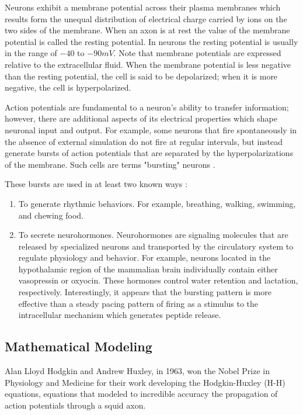 \documentclass[12]{book}
\newcommand\0{\mathbf{0}}
\newcommand\<{\langle}
\renewcommand\>{\rangle}
\begin{document}
Neurons exhibit a membrane potential across their plasma membranes which results form the unequal distribution of electrical charge carried by ions on the two sides of the membrane. When an axon is at rest the value of the membrane potential is called the resting potential. In neurons the resting potential is usually in the range of $-40$ to $-90 mV$. Note that membrane potentials are expressed relative to the extracellular fluid. When the membrane potential is less negative than the resting potential, the cell is said to be depolarized; when it is more negative, the cell is hyperpolarized.

Action potentials are fundamental to a neuron's ability to transfer information; however, there are additional aspects of its electrical properties which shape neuronal input and output. For example, some neurons that fire spontaneously in the absence of external simulation do not fire at regular intervals, but instead generate bursts of action potentials that are separated by the hyperpolarizations of the membrane. Such cells are terms "bursting" neurons \cite{levitan2015neuron}.

These bursts are used in at least two known ways \cite{levitan2015neuron}:

\begin{enumerate}
\item To generate rhythmic behaviors. For example, breathing, walking, swimming, and chewing food.	
\item To secrete neurohormones. Neurohormones are signaling molecules that are released by specialized neurons and transported by the circulatory system to regulate physiology and behavior. For example, neurons located in the hypothalamic region of the mammalian brain individually contain either vasopressin or oxyocin. These hormones control water retention and lactation, respectively. Interestingly, it appears that the bursting pattern is more effective than a steady pacing pattern of firing as a stimulus to the intracellular mechanism which generates peptide release.
\end{enumerate}

\subsection{Mathematical Modeling}

Alan Lloyd Hodgkin and Andrew Huxley, in 1963, won the Nobel Prize in Physiology and Medicine for their work developing the Hodgkin-Huxley (H-H) equations, equations that modeled to incredible accuracy the propagation of action potentials through a squid axon. 
\end{document}
